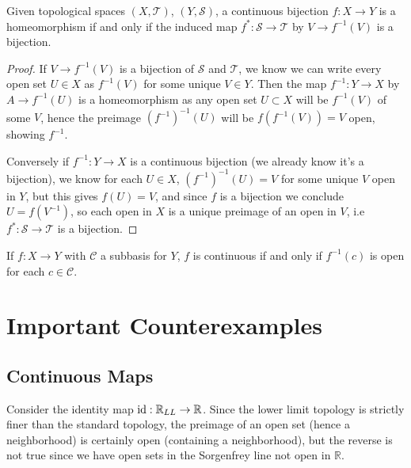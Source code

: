 \documentclass[12pt,letterpaper,reqno]{article}
\begin{document}
\begin{proposition}\label{proposition:homeomorphisms-correspond-to-bijections-of-topology}
    Given topological spaces $(X, \mathcal{T})$, $(Y, \mathcal{S})$, a continuous bijection $f: X \to Y$ is a homeomorphism if and only if the induced map $f^{*}: \mathcal{S} \to \mathcal{T}$ by $V \to f^{-1}(V)$ is a bijection.
\end{proposition}

\begin{proof}
    If $V \to f^{-1}(V)$ is a bijection of $\mathcal{S}$ and $\mathcal{T}$, we know we can write every open set $U \in X$ as $f^{-1}(V)$ for some unique $V \in Y$. Then the map $f^{-1}: Y \to X$ by $A \to f^{-1}(U)$ is a homeomorphism as any open set $U \subset X$ will be $f^{-1}(V)$ of some $V$, hence the preimage $(f^{-1})^{-1}(U)$ will be $f(f^{-1}(V)) = V$ open, showing $f^{-1}$. 

    Conversely if $f^{-1}: Y \to X$ is a continuous bijection (we already know it's a bijection), we know for each $U \in X$, $(f^{-1})^{-1}(U) = V$ for some unique $V$ open in $Y$, but this gives $f(U) = V$, and since $f$ is a bijection we conclude $U = f(V^{-1})$, so each open in $X$ is a unique preimage of an open in $V$, i.e $f^*: \mathcal{S} \to \mathcal{T}$ is a bijection. 
\end{proof}

\begin{lemma}\label{lemma:condition-for-continuity-by-subbases}
    If $f: X \to Y$ with $\mathcal{C}$ a subbasis for $Y$, $f$ is continuous if and only if $f^{-1}(c)$ is open for each $c \in \mathcal{C}$.
\end{lemma}



\newpage
\section{Important Counterexamples}

\subsection{Continuous Maps}

\begin{example}
    Consider the identity map $\text{id}: \mathbb{R}_{LL} \to \mathbb{R}$. Since the lower limit topology is strictly finer than the standard topology, the preimage of an open set (hence a neighborhood) is certainly open (containing a neighborhood), but the reverse is not true since we have open sets in the Sorgenfrey line not open in $\mathbb{R}$.
\end{example}
\end{document}
